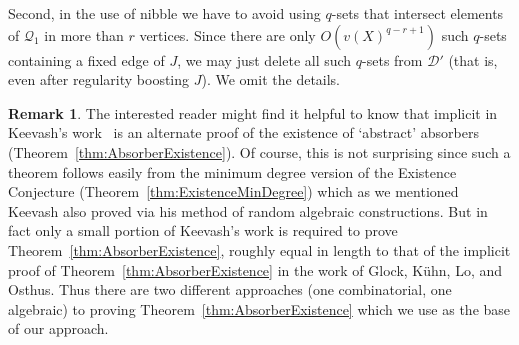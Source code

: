 \documentclass[11pt]{article}
\newcounter{i}
\theoremstyle{plain}
\theoremstyle{plain} %
\theoremstyle{definition}
\newtheorem{remark}[thm]{Remark}
\begin{document}
Second, in the use of nibble we have to avoid using $q$-sets that intersect elements of $\mathcal{Q}_1$ in more than $r$ vertices. Since there are only $O(v(X)^{q-r+1})$ such $q$-sets containing a fixed edge of $J$, we may just delete all such $q$-sets from $\mathcal{D}'$ (that is, even after regularity boosting $J$). We omit the details.



\begin{remark}
The interested reader might find it helpful to know that implicit in Keevash's work~\cite{K14} is an alternate proof of the existence of `abstract' absorbers (Theorem~\ref{thm:AbsorberExistence}). Of course, this is not surprising since such a theorem follows easily from the minimum degree version of the Existence Conjecture (Theorem~\ref{thm:ExistenceMinDegree}) which as we mentioned Keevash also proved via his method of random algebraic constructions. But in fact only a small portion of Keevash's work is required to prove Theorem~\ref{thm:AbsorberExistence}, roughly equal in length to that of the implicit proof of Theorem~\ref{thm:AbsorberExistence} in the work of Glock, K\"{u}hn, Lo, and Osthus. Thus there are two different approaches (one combinatorial, one algebraic) to proving Theorem~\ref{thm:AbsorberExistence} which we use as the base of our approach.    
\end{remark}


\end{document}

